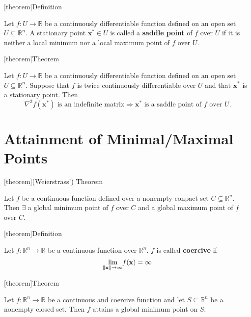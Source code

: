 \documentclass[12pt]{report}
\theoremstyle{definition}
\begin{document}
[theorem]{Definition}
\begin{saddle points}
    Let $f:U\rightarrow\mathbb{R}$ be a continuously differentiable function
    defined on an open set $U\subseteq\mathbb{R}^{n}$. A stationary point 
    $\mathbf{x}^*\in U$ is called a \textbf{saddle point} of $f$ over $U$ if it
    is neither a local minimum nor a local maximum point of $f$ over $U$.
\end{saddle points}

[theorem]{Theorem}
\begin{sufficient condition for saddle points}
    Let $f:U\rightarrow\mathbb{R}$ be a continuously differentiable function
    defined on an open set $U\subseteq\mathbb{R}^{n}$. 
    Suppose that $f$ is twice continuously differentiable over $U$ and that
    $\mathbf{x}^*$ is a stationary point. Then
    \[
        \nabla^2 f(\mathbf{x}^*) \text{ is an indefinite matrix} \Longrightarrow \mathbf{x}^*
        \text{ is a saddle point of $f$ over $U$}.
    \]
\end{sufficient condition for saddle points}

\section{Attainment of Minimal/Maximal Points}

[theorem]{(Weierstrass') Theorem}
\begin{Weierstrass' Theorem}
    Let $f$ be a continuous function defined over a nonempty conpact set
    $C\subseteq\mathbb{R}^{n}$. Then $\exists$ a global minimum point of $f$
    over $C$ and a global maximum point of $f$ over $C$.
\end{Weierstrass' Theorem}

[theorem]{Definition}
\begin{coerciveness}
    Let $f:\mathbb{R}^{n}\rightarrow\mathbb{R}$ be a continuous function over
    $\mathbb{R}^{n}$. $f$ is called \textbf{coercive} if
    \[
        \underset{\norm{\mathbf{x}}\rightarrow\infty}{\lim}f(\mathbf{x})=\infty
    \]
\end{coerciveness}

[theorem]{Theorem}
\begin{attainment of global optima}
    Let $f:\mathbb{R}^{n}\rightarrow\mathbb{R}$ be a continuous and coercive function
    and let $S\subseteq\mathbb{R}^{n}$ be a nonempty closed set. Then $f$
    attains a global minimum point on $S$.
\end{attainment of global optima}
\end{document}
